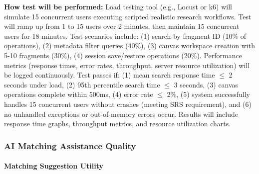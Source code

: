 \documentclass[12pt, titlepage]{article}
\begin{document}
\begin{enumerate}
\textbf{How test will be performed:} Load testing tool (e.g., Locust or k6) will simulate 15 concurrent users executing scripted realistic research workflows. Test will ramp up from 1 to 15 users over 2 minutes, then maintain 15 concurrent users for 18 minutes. Test scenarios include: (1) search by fragment ID (10\% of operations), (2) metadata filter queries (40\%), (3) canvas workspace creation with 5-10 fragments (30\%), (4) session save/restore operations (20\%). Performance metrics (response times, error rates, throughput, server resource utilization) will be logged continuously. Test passes if: (1) mean search response time $\leq$ 2 seconds under load, (2) 95th percentile search time $\leq$ 3 seconds, (3) canvas operations complete within 500ms, (4) error rate $\leq$ 2\%, (5) system successfully handles 15 concurrent users without crashes (meeting SRS requirement), and (6) no unhandled exceptions or out-of-memory errors occur. Results will include response time graphs, throughput metrics, and resource utilization charts.

\end{enumerate}

\subsubsection{AI Matching Assistance Quality}

\paragraph{Matching Suggestion Utility}
\end{document}
